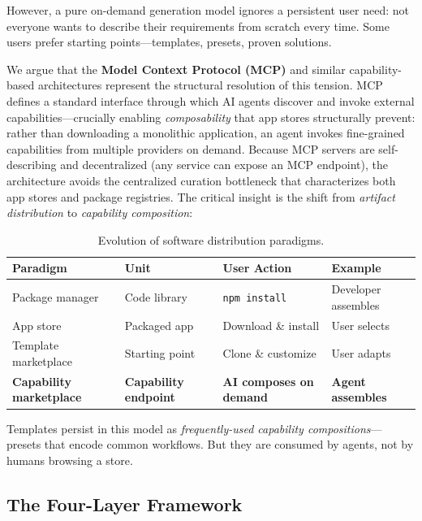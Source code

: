 \documentclass[12pt]{article}
\begin{document}
However, a pure on-demand generation model ignores a persistent user need: not everyone wants to describe their requirements from scratch every time. Some users prefer starting points---templates, presets, proven solutions.

We argue that the \textbf{Model Context Protocol (MCP)} \citep{mcp2024} and similar capability-based architectures represent the structural resolution of this tension. MCP defines a standard interface through which AI agents discover and invoke external capabilities---crucially enabling \textit{composability} that app stores structurally prevent: rather than downloading a monolithic application, an agent invokes fine-grained capabilities from multiple providers on demand. Because MCP servers are self-describing and decentralized (any service can expose an MCP endpoint), the architecture avoids the centralized curation bottleneck that characterizes both app stores and package registries. The critical insight is the shift from \textit{artifact distribution} to \textit{capability composition}:

\begin{table}[h]
\centering
\small
\begin{tabularx}{\textwidth}{lXXX}
\toprule
\textbf{Paradigm} & \textbf{Unit} & \textbf{User Action} & \textbf{Example} \\
\midrule
Package manager & Code library & \texttt{npm install} & Developer assembles \\
App store & Packaged app & Download \& install & User selects \\
Template marketplace & Starting point & Clone \& customize & User adapts \\
\textbf{Capability marketplace} & \textbf{Capability endpoint} & \textbf{AI composes on demand} & \textbf{Agent assembles} \\
\bottomrule
\end{tabularx}
\caption{Evolution of software distribution paradigms.}
\label{tab:distribution}
\end{table}

Templates persist in this model as \textit{frequently-used capability compositions}---presets that encode common workflows. But they are consumed by agents, not by humans browsing a store.

\subsection{The Four-Layer Framework}
\end{document}
